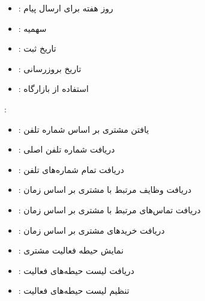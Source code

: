 \documentclass[letterpaper,10pt,english]{sphinxmanual}
\begin{document}
\begin{itemize}
\item {} 
\sphinxAtStartPar
{}: روز هفته برای ارسال پیام

\item {} 
\sphinxAtStartPar
{}: سهمیه

\item {} 
\sphinxAtStartPar
{}: تاریخ ثبت

\item {} 
\sphinxAtStartPar
{}: تاریخ بروزرسانی

\item {} 
\sphinxAtStartPar
{}: استفاده از بازارگاه

\end{itemize}

\sphinxAtStartPar
{}:
\begin{itemize}
\item {} 
\sphinxAtStartPar
{}: یافتن مشتری بر اساس شماره تلفن

\item {} 
\sphinxAtStartPar
{}: دریافت شماره تلفن اصلی

\item {} 
\sphinxAtStartPar
{}: دریافت تمام شماره‌های تلفن

\item {} 
\sphinxAtStartPar
{}: دریافت وظایف مرتبط با مشتری بر اساس زمان

\item {} 
\sphinxAtStartPar
{}: دریافت تماس‌های مرتبط با مشتری بر اساس زمان

\item {} 
\sphinxAtStartPar
{}: دریافت خریدهای مشتری بر اساس زمان

\item {} 
\sphinxAtStartPar
{}: نمایش حیطه فعالیت مشتری

\item {} 
\sphinxAtStartPar
{}: دریافت لیست حیطه‌های فعالیت

\item {} 
\sphinxAtStartPar
{}: تنظیم لیست حیطه‌های فعالیت

\end{itemize}
\end{document}
